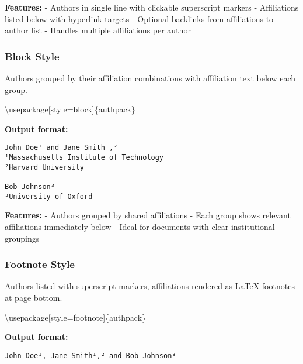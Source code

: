 \documentclass[
]{article}
\newenvironment{Shaded}{}{}
\newcommand{\BuiltInTok}[1]{#1}
\newcommand{\ExtensionTok}[1]{#1}
\newcommand{\NormalTok}[1]{#1}
\begin{document}
\textbf{Features:} - Authors in single line with clickable superscript
markers - Affiliations listed below with hyperlink targets - Optional
backlinks from affiliations to author list - Handles multiple
affiliations per author

\hypertarget{block-style}{%
\subsubsection{Block Style}\label{block-style}}

Authors grouped by their affiliation combinations with affiliation text
below each group.

\begin{Shaded}
\begin{Highlighting}[]
\BuiltInTok{\textbackslash{}usepackage}\NormalTok{[style=block]\{}\ExtensionTok{authpack}\NormalTok{\}}
\end{Highlighting}
\end{Shaded}

\textbf{Output format:}

\begin{verbatim}
John Doe¹ and Jane Smith¹,²
¹Massachusetts Institute of Technology
²Harvard University

Bob Johnson³
³University of Oxford
\end{verbatim}

\textbf{Features:} - Authors grouped by shared affiliations - Each group
shows relevant affiliations immediately below - Ideal for documents with
clear institutional groupings

\hypertarget{footnote-style}{%
\subsubsection{Footnote Style}\label{footnote-style}}

Authors listed with superscript markers, affiliations rendered as LaTeX
footnotes at page bottom.

\begin{Shaded}
\begin{Highlighting}[]
\BuiltInTok{\textbackslash{}usepackage}\NormalTok{[style=footnote]\{}\ExtensionTok{authpack}\NormalTok{\}}
\end{Highlighting}
\end{Shaded}

\textbf{Output format:}

\begin{verbatim}
John Doe¹, Jane Smith¹,² and Bob Johnson³
\end{verbatim}
\end{document}
